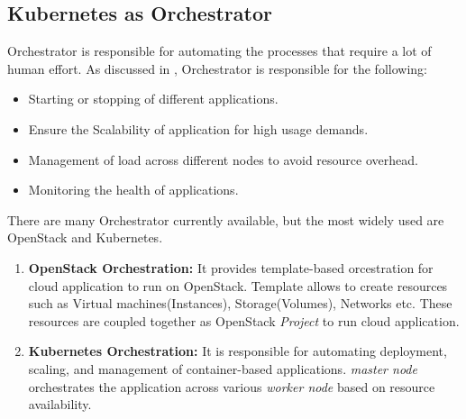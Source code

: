 \subsection{Kubernetes as Orchestrator}
\label{sec:k8s_orchestrator}
Orchestrator is responsible for automating the processes that require a lot of human effort. As discussed in \cite{containerjournal}, Orchestrator is responsible for the following:
\begin{itemize}
  \item Starting or stopping of different applications.
  \item Ensure the Scalability of application for high usage demands.
  \item Management of load across different nodes to avoid resource overhead.
  \item Monitoring the health of applications.
\end{itemize}
There are many Orchestrator currently available, but the most widely used are OpenStack and Kubernetes.
\begin{enumerate}
  \item \textbf{OpenStack Orchestration:} It provides template-based orcestration for cloud application to run on OpenStack. Template allows to create resources such as Virtual machines(Instances), Storage(Volumes), Networks etc. These resources are coupled together as OpenStack \emph{Project} to run cloud application\cite{openstackOrchestrator}.
  \item \textbf{Kubernetes Orchestration:} It is responsible for automating deployment, scaling, and management of container-based applications. \emph{master node} orchestrates the application across various \emph{worker node} based on resource availability\cite{k8s}.
\end{enumerate}
